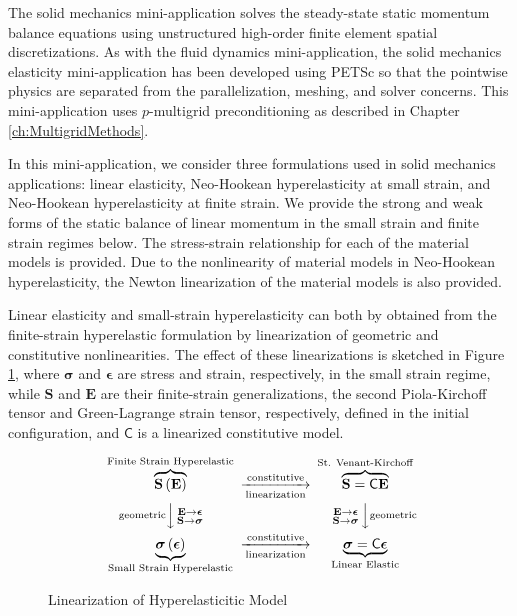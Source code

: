 The solid mechanics mini-application solves the steady-state static momentum balance equations using unstructured high-order finite element spatial discretizations.
As with the fluid dynamics mini-application, the solid mechanics elasticity mini-application has been developed using PETSc so that the pointwise physics are separated from the parallelization, meshing, and solver concerns.
This mini-application uses $p$-multigrid preconditioning as described in Chapter \ref{ch:MultigridMethods}.

In this mini-application, we consider three formulations used in solid mechanics applications: linear elasticity, Neo-Hookean hyperelasticity at small strain, and Neo-Hookean hyperelasticity at finite strain.
We provide the strong and weak forms of the static balance of linear momentum in the small strain and finite strain regimes below.
The stress-strain relationship for each of the material models is provided.
Due to the nonlinearity of material models in Neo-Hookean hyperelasticity, the Newton linearization of the material models is also provided.

Linear elasticity and small-strain hyperelasticity can both by obtained from the finite-strain hyperelastic formulation by linearization of geometric and constitutive nonlinearities.
The effect of these linearizations is sketched in Figure \ref{fig:hyperelastic-cd}, where $\boldsymbol \sigma$ and $\boldsymbol \epsilon$ are stress and strain, respectively, in the small strain regime, while $\mathbf S$ and $\mathbf E$ are their finite-strain generalizations, the second Piola-Kirchoff tensor and Green-Lagrange strain tensor, respectively, defined in the initial configuration, and $\mathsf C$ is a linearized constitutive model.

\begin{figure}
$$
      \begin{CD}
        {\overbrace{\mathbf S \left( \mathbf E \right)}^{\text{Finite Strain Hyperelastic}}}
        @>{\text{constitutive}}>{\text{linearization}}>
        {\overbrace{\mathbf S = \mathsf C \mathbf E}^{\text{St. Venant-Kirchoff}}} \\
        @V{\text{geometric}}V{\begin{smallmatrix}\mathbf E \to \boldsymbol \epsilon \\ \mathbf S \to \boldsymbol \sigma \end{smallmatrix}}V
        @V{\begin{smallmatrix}\mathbf E \to \boldsymbol \epsilon \\ \mathbf S \to \boldsymbol \sigma \end{smallmatrix}}V{\text{geometric}}V \\
        {\underbrace{\boldsymbol \sigma \left( \boldsymbol \epsilon \right)}_\text{Small Strain Hyperelastic}}
        @>{\text{constitutive}}>\text{linearization}>
        {\underbrace{\boldsymbol \sigma = \mathsf C \boldsymbol \epsilon}_\text{Linear Elastic}}
      \end{CD}
$$
\caption{Linearization of Hyperelasticitic Model}
\label{fig:hyperelastic-cd}
\end{figure}

